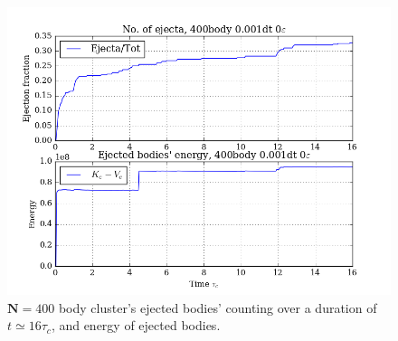 \documentclass[11pt,a4paper,notitlepage,twocolumn]{article}
\begin{document}
\begin{figure}
[H]\center
\includegraphics[scale=0.35]{../figs/ClusterEnergiesEjecEn_400body_dt1_eps0_dur16.png}
\caption{$\mathbf{N} = 400$ body cluster's ejected bodies' counting over a duration of $t \simeq 16\tau_c$, and energy of ejected bodies.}
\end{figure}
\end{document}
